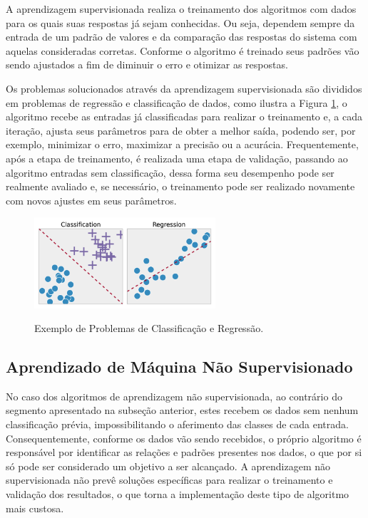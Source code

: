 \documentclass[oneside,openright,12pt]{ufsm_2015} %
\begin{document}
\par A aprendizagem supervisionada realiza o treinamento dos algoritmos com dados para os quais suas respostas já sejam conhecidas. Ou seja, dependem sempre da entrada de um padrão de valores e da comparação das respostas do sistema com aquelas consideradas corretas. Conforme o algoritmo é treinado seus padrões vão sendo ajustados a fim de diminuir o erro e otimizar as respostas. 

\par Os problemas solucionados através da aprendizagem supervisionada são divididos em problemas de regressão e classificação de dados, como ilustra a Figura \ref{fig:aprend-sup}, o algoritmo recebe as entradas já classificadas para realizar o treinamento e, a cada iteração, ajusta seus parâmetros para de obter a melhor saída, podendo ser, por exemplo, minimizar o erro, maximizar a precisão ou a acurácia. Frequentemente, após a etapa de treinamento, é realizada uma etapa de validação, passando ao algoritmo entradas sem classificação, dessa forma seu desempenho pode ser realmente avaliado e, se necessário, o treinamento pode ser realizado novamente com novos ajustes em seus parâmetros.

\begin{figure}[ht]
     \caption{Exemplo de Problemas de Classificação e Regressão.}
\centering
\includegraphics[width=0.6\textwidth]{figuras/aprend-sup.png}
\vspace{\baselineskip} %
\label{fig:aprend-sup}
\end{figure}

\subsection{Aprendizado de Máquina Não Supervisionado}
\label{sec:aprend-maquina-nao-sup}

\par No caso dos algoritmos de aprendizagem não supervisionada, ao contrário do segmento apresentado na subseção anterior, estes recebem os dados sem nenhum classificação prévia, impossibilitando o aferimento das classes de cada entrada. Consequentemente, conforme os dados vão sendo recebidos, o próprio algoritmo é responsável por identificar as relações e padrões presentes nos dados, o que por si só pode ser considerado um objetivo a ser alcançado. A aprendizagem não supervisionada não prevê soluções específicas para realizar o treinamento e validação dos resultados, o que torna a implementação deste tipo de algoritmo mais custosa.
\end{document}
